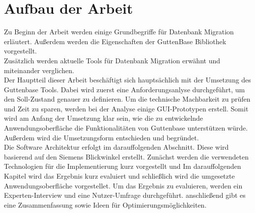 \section{Aufbau der Arbeit}
Zu Beginn der Arbeit werden einige Grundbegriffe für Datenbank Migration erläutert. Außerdem werden die Eigenschaften der GuttenBase Bibliothek vorgestellt.\\
Zusätzlich werden aktuelle Tools für Datenbank Migration erwähnt und miteinander verglichen.\\
Der Hauptteil dieser Arbeit beschäftigt sich hauptsächlich mit der Umsetzung des Guttenbase Tools. Dabei wird zuerst eine Anforderungsanlyse durchgeführt, um den Soll-Zustand genauer zu definieren. Um die technische Machbarkeit zu prüfen und Zeit zu sparen, werden bei der Analyse einige GUI-Prototypen erstell. Somit wird am Anfang der Umsetzung klar sein, wie die zu entwickelnde Anwendungsoberfläche die Funktionalitäten von Guttenbase unterstützen würde. Außerdem wird die Umsetzungsform entschieden und begründet. \\
Die Software Architektur erfolgt im darauffolgenden Abschnitt. Diese wird basierend auf den Siemens Blickwinkel erstellt. Zunächst werden die verwendeten Technologien für die Implementierung kurz vorgestellt und 
Im darauffolgenden Kapitel wird das Ergebnis kurz evaluiert und schließlich wird die umgesetzte Anwendungsoberfläche vorgestellet. 
Um das Ergebnis zu evaluieren, werden ein Experten-Interview und eine Nutzer-Umfrage durchgeführt.
anschließend gibt es eine Zusammenfassung sowie Ideen für Optimierungsmöglichkeiten.